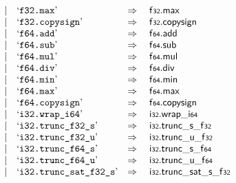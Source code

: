 $$\begin{array}[t]{@{}lrrl@{}l@{}l@{}l@{}}
& & | & \mbox{‘\texttt{f32.max}’} & \quad\Rightarrow\quad{} & \mathsf{f{\scriptstyle 32}} {.} \mathsf{max} \\
& & | & \mbox{‘\texttt{f32.copysign}’} & \quad\Rightarrow\quad{} & \mathsf{f{\scriptstyle 32}} {.} \mathsf{copysign} \\
& & | & \mbox{‘\texttt{f64.add}’} & \quad\Rightarrow\quad{} & \mathsf{f{\scriptstyle 64}} {.} \mathsf{add} \\
& & | & \mbox{‘\texttt{f64.sub}’} & \quad\Rightarrow\quad{} & \mathsf{f{\scriptstyle 64}} {.} \mathsf{sub} \\
& & | & \mbox{‘\texttt{f64.mul}’} & \quad\Rightarrow\quad{} & \mathsf{f{\scriptstyle 64}} {.} \mathsf{mul} \\
& & | & \mbox{‘\texttt{f64.div}’} & \quad\Rightarrow\quad{} & \mathsf{f{\scriptstyle 64}} {.} \mathsf{div} \\
& & | & \mbox{‘\texttt{f64.min}’} & \quad\Rightarrow\quad{} & \mathsf{f{\scriptstyle 64}} {.} \mathsf{min} \\
& & | & \mbox{‘\texttt{f64.max}’} & \quad\Rightarrow\quad{} & \mathsf{f{\scriptstyle 64}} {.} \mathsf{max} \\
& & | & \mbox{‘\texttt{f64.copysign}’} & \quad\Rightarrow\quad{} & \mathsf{f{\scriptstyle 64}} {.} \mathsf{copysign} \\
& & | & \mbox{‘\texttt{i32.wrap\_i64}’} & \quad\Rightarrow\quad{} & \mathsf{i{\scriptstyle 32}} {.} {\mathsf{wrap}}{\mathsf{\_}}{\mathsf{i{\scriptstyle 64}}} \\
& & | & \mbox{‘\texttt{i32.trunc\_f32\_s}’} & \quad\Rightarrow\quad{} & \mathsf{i{\scriptstyle 32}} {.} {{\mathsf{trunc}}{\mathsf{\_}}{\mathsf{s}}}{\mathsf{\_}}{\mathsf{f{\scriptstyle 32}}} \\
& & | & \mbox{‘\texttt{i32.trunc\_f32\_u}’} & \quad\Rightarrow\quad{} & \mathsf{i{\scriptstyle 32}} {.} {{\mathsf{trunc}}{\mathsf{\_}}{\mathsf{u}}}{\mathsf{\_}}{\mathsf{f{\scriptstyle 32}}} \\
& & | & \mbox{‘\texttt{i32.trunc\_f64\_s}’} & \quad\Rightarrow\quad{} & \mathsf{i{\scriptstyle 32}} {.} {{\mathsf{trunc}}{\mathsf{\_}}{\mathsf{s}}}{\mathsf{\_}}{\mathsf{f{\scriptstyle 64}}} \\
& & | & \mbox{‘\texttt{i32.trunc\_f64\_u}’} & \quad\Rightarrow\quad{} & \mathsf{i{\scriptstyle 32}} {.} {{\mathsf{trunc}}{\mathsf{\_}}{\mathsf{u}}}{\mathsf{\_}}{\mathsf{f{\scriptstyle 64}}} \\
& & | & \mbox{‘\texttt{i32.trunc\_sat\_f32\_s}’} & \quad\Rightarrow\quad{} & \mathsf{i{\scriptstyle 32}} {.} {{\mathsf{trunc\_sat}}{\mathsf{\_}}{\mathsf{s}}}{\mathsf{\_}}{\mathsf{f{\scriptstyle 32}}} \\

\end{array}$$
